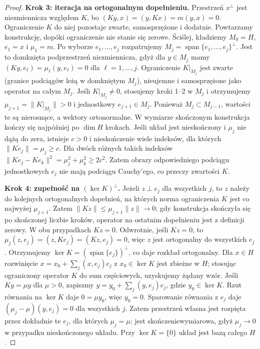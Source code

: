 \begin{proof}
\textbf{Krok 3: iteracja na ortogonalnym dopełnieniu.}
Przestrzeń $x^\perp$ jest niezmiennicza względem $K$,
bo $(Ky,x)=(y,Kx)=m(y,x)=0$. Ograniczenie $K$ do niej
pozostaje zwarte, samosprzężone i dodatnie. Powtarzamy
konstrukcję, dopóki ograniczenie nie stanie się zerowe.
Ściślej, kładziemy $M_0=H$, $e_1=x$ i $\mu_1=m$.
Po wyborze $e_1,\ldots,e_j$ rozpatrujemy
$M_j=\operatorname{span}\{e_1,\ldots,e_j\}^\perp$.
Jest to domknięta podprzestrzeń niezmiennicza, gdyż
dla $y\in M_j$ mamy $(Ky,e_\ell)=\mu_\ell(y,e_\ell)=0$
dla $\ell=1,\ldots,j$. Ograniczenie $K|_{M_j}$
jest zwarte (granice podciągów leżą w domkniętym $M_j$),
nieujemne i samosprzężone jako operator na całym $M_j$.
Jeśli $K|_{M_j}\ne0$, stosujemy kroki 1--2 w $M_j$
i otrzymujemy $\mu_{j+1}=\|K|_{M_j}\|>0$ i jednostkowy
$e_{j+1}\in M_j$. Ponieważ $M_j\subset M_{j-1}$,
wartości te są nierosnące, a wektory ortonormalne.
W wymiarze skończonym konstrukcja kończy się najpóźniej
po $\dim H$ krokach.
Jeśli układ jest nieskończony i $\mu_j$ nie dążą do zera,
istnieje $c>0$ i nieskończenie wiele indeksów, dla których
$\|Ke_j\|=\mu_j\ge c$. Dla dwóch różnych takich indeksów
$\|Ke_j-Ke_k\|^2=\mu_j^2+\mu_k^2\ge2c^2$.
Zatem obrazy odpowiedniego podciągu jednostkowych $e_j$
nie mają podciągu Cauchy'ego, co przeczy zwartości $K$.

\textbf{Krok 4: zupełność na $(\ker K)^\perp$.}
Jeżeli $z\perp e_j$ dla wszystkich $j$, to $z$
należy do kolejnych ortogonalnych dopełnień, na których
norma ograniczenia $K$ jest co najwyżej $\mu_{j+1}$.
Zatem $\|Kz\|\le\mu_{j+1}\|z\|\to0$;
gdy konstrukcja skończyła się po skończonej liczbie kroków,
operator na ostatnim dopełnieniu jest z definicji zerowy.
W obu przypadkach $Kz=0$. Odwrotnie, jeśli $Kz=0$,
to $\mu_j(z,e_j)=(z,Ke_j)=(Kz,e_j)=0$, więc $z$
jest ortogonalny do wszystkich $e_j$. Otrzymujemy
$\ker K=(\overline{\operatorname{span}}\{e_j\})^\perp$,
co daje rozkład ortogonalny. Dla $x\in H$ rozwinięcie
$x=x_0+\sum_j(x,e_j)e_j$ z $x_0\in\ker K$ jest
zbieżne w $H$; stosując ograniczony operator $K$
do sum częściowych, uzyskujemy żądany wzór.
Jeśli $Ky=\mu y$ dla $\mu>0$, zapiszmy
$y=y_0+\sum_j(y,e_j)e_j$, gdzie $y_0\in\ker K$.
Rzut równania na $\ker K$ daje $0=\mu y_0$, więc $y_0=0$.
Sparowanie równania z $e_j$ daje
$(\mu_j-\mu)(y,e_j)=0$ dla wszystkich $j$.
Zatem przestrzeń własna jest rozpięta przez dokładnie
te $e_j$, dla których $\mu_j=\mu$; jest skończeniewymiarowa,
gdyż $\mu_j\to0$ w przypadku nieskończonego układu.
Przy $\ker K=\{0\}$ układ jest bazą całego $H$.
\end{proof}

